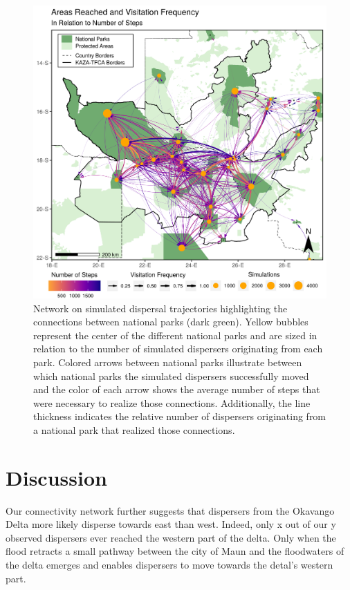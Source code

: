 \documentclass[abstract=on,10pt,a4paper,bibliography=totocnumbered]{article}
\begin{document}
\begin{figure}
  \includegraphics[width=\textwidth]{99_AreasReached.png}
  \caption{Network on simulated dispersal trajectories highlighting the
  connections between national parks (dark green). Yellow bubbles represent the
  center of the different national parks and are sized in relation to the number
  of simulated dispersers originating from each park. Colored arrows between
  national parks illustrate between which national parks the simulated
  dispersers successfully moved and the color of each arrow shows the average
  number of steps that were necessary to realize those connections.
  Additionally, the line thickness indicates the relative number of dispersers
  originating from a national park that realized those connections.}
  \label{AreasReached}
\end{figure}

\section{Discussion}
Our connectivity network further suggests that dispersers from the Okavango
Delta more likely disperse towards east than west. Indeed, only x out of our y
observed dispersers ever reached the western part of the delta. Only when the
flood retracts a small pathway between the city of Maun and the floodwaters of
the delta emerges and enables dispersers to move towards the detal's western
part.
\end{document}
